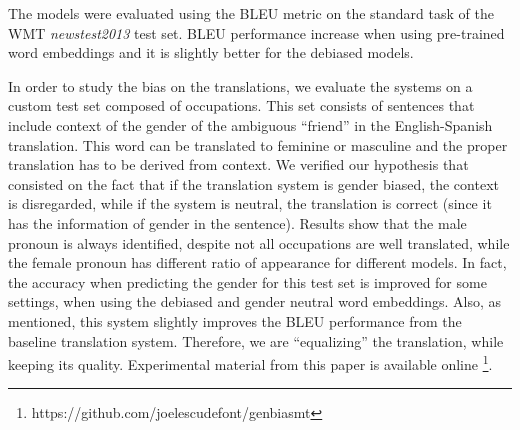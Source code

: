 \documentclass[11pt,a4paper]{article}
\begin{document}
The models were evaluated using the BLEU metric on the standard task of the WMT \textit{newstest2013} test set. BLEU performance increase when using pre-trained word embeddings and it is slightly better for the debiased models.

In order to study the bias on the translations, we evaluate the systems on a custom test set composed of occupations.
This set consists of sentences that include context of the gender of the ambiguous ``friend'' in the English-Spanish translation.  This word can be translated to feminine or masculine and the proper translation has to be derived from context. We verified our hypothesis that consisted on the fact that if the translation system is gender biased, the context is disregarded, while if the system is neutral, the translation is correct (since it has the information of gender in the sentence). Results show that the male pronoun is always identified, despite not all occupations are well translated, while the female pronoun has different ratio of appearance for different models. 
In fact, the accuracy when predicting the gender for this test set is improved for some settings, when using the debiased and gender neutral word embeddings.
Also, as mentioned, this system slightly improves the BLEU performance from the baseline translation system. 
Therefore, we are ``equalizing'' the translation, while keeping its quality. 
Experimental material from this paper is available online \footnote{https://github.com/joelescudefont/genbiasmt}.



\end{document}
